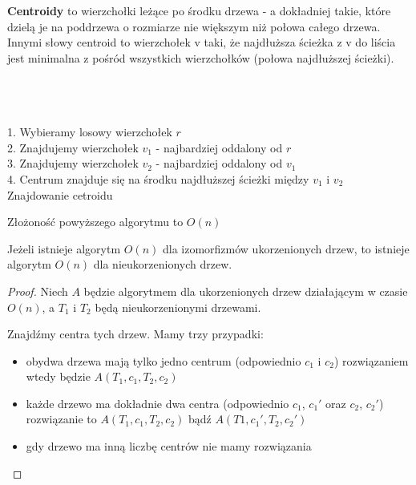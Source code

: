 \begin{definition}
    \textbf{Centroidy} to wierzchołki leżące po środku drzewa - a dokładniej takie, które dzielą je na poddrzewa o rozmiarze nie większym niż połowa całego drzewa. Innymi słowy centroid to wierzchołek v taki, że najdłuższa ścieżka z v do liścia jest minimalna z pośród wszystkich wierzchołków (połowa najdłuższej ścieżki).

    \begin{algorithm}[H]
        \DontPrintSemicolon
        \\
        \\
        \\
        1. Wybieramy losowy wierzchołek $r$ \\
        2. Znajdujemy wierzchołek $v_1$ - najbardziej oddalony od $r$ \\
        3. Znajdujemy wierzchołek $v_2$ - najbardziej oddalony od $v_1$ \\
        4. Centrum znajduje się na środku najdłuższej ścieżki między $v_1$ i $v_2$ \\
        \caption{Znajdowanie cetroidu}
    \end{algorithm}

Złożoność powyższego algorytmu to $O(n)$

\end{definition}

\begin{lemma}
Jeżeli istnieje algorytm $O(n)$ dla izomorfizmów ukorzenionych drzew, to istnieje algorytm $O(n)$ dla nieukorzenionych drzew.
\end{lemma}

\begin{proof}

Niech $A$ będzie algorytmem dla ukorzenionych drzew działającym w czasie $O(n)$, a $T_1$ i $T_2$ będą nieukorzenionymi drzewami.

Znajdźmy centra tych drzew. Mamy trzy przypadki:
\begin{itemize}
\item obydwa drzewa mają tylko jedno centrum (odpowiednio $c_1$ i $c_2$) rozwiązaniem wtedy będzie $A(T_1, c_1, T_2, c_2)$
\item każde drzewo ma dokładnie dwa centra (odpowiednio $c_1$, $c_1\prime$ oraz $c_2$, $c_2\prime$) rozwiązanie to $A(T_1, c_1, T_2, c_2)$ bądź $A(T1, c_1\prime,T_2, c_2\prime)$
\item gdy drzewo ma inną liczbę centrów nie mamy rozwiązania

\end{itemize}

\end{proof}

